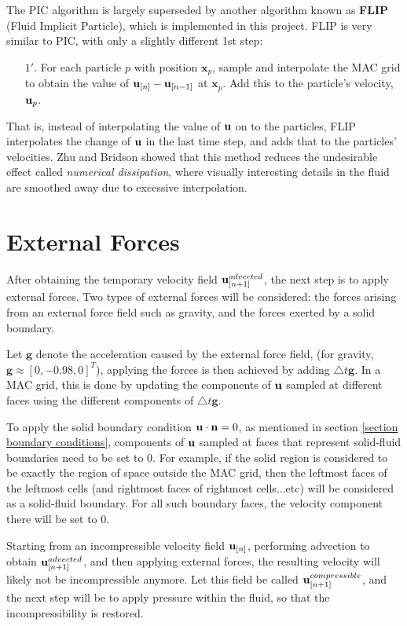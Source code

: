 The PIC algorithm is largely superseded by another algorithm known as \textbf{FLIP} (Fluid Implicit Particle), which is implemented in this project. FLIP is very similar to PIC, with only a slightly different 1st step:
\begin{enumerate}
    \item [$1'.$]
    For each particle $p$ with position $\textbf{x}_p$, sample and interpolate the MAC grid to obtain the value of $\textbf{u}_{[n]} - \textbf{u}_{[n-1]}$ at $\textbf{x}_p$. Add this to the particle's velocity,  $\textbf{u}_p$.
\end{enumerate}
That is, instead of interpolating the value of $\textbf{u}$ on to the particles, FLIP interpolates the change of $\textbf{u}$ in the last time step, and adds that to the particles' velocities. Zhu and Bridson \cite{zhu2005animating} showed that this method reduces the undesirable effect called \textit{numerical dissipation}, where visually interesting details in the fluid are smoothed away due to excessive interpolation.



\section{External Forces}

After obtaining the temporary velocity field $\textbf{u}_{[n+1]}^{advected}$, the next step is to apply external forces. Two types of external forces will be considered: the forces arising from an external force field such as gravity, and the forces exerted by a solid boundary.

Let $\textbf{g}$ denote the acceleration caused by the external force field, (for gravity, $\textbf{g}\approx[0,-0.98,0]^T$), applying the forces is then achieved by adding $\triangle t \textbf{g}$. In a MAC grid, this is done by updating the components of $\textbf{u}$ sampled at different faces using the different components of $\triangle t \textbf{g}$. 


To apply the solid boundary condition $\textbf{u} \cdot \textbf{n} = 0$, as mentioned in section \ref{section boundary conditions}, components of $\textbf{u}$ sampled at faces that represent solid-fluid boundaries need to be set to 0. For example, if the solid region is considered to be exactly the region of space outside the MAC grid, then the leftmost faces of the leftmost cells (and rightmost faces of rightmost cells...etc) will be considered as a solid-fluid boundary. For all such boundary faces, the velocity component there will be set to 0. 

Starting from an incompressible velocity field $\textbf{u}_{[n]}$, performing advection to obtain $\textbf{u}_{[n+1]}^{advected}$, and then applying external forces, the resulting velocity will likely not be incompressible anymore. Let this field be called $\textbf{u}_{[n+1]}^{compressible}$, and the next step will be to apply pressure within the fluid, so that the incompressibility is restored.


